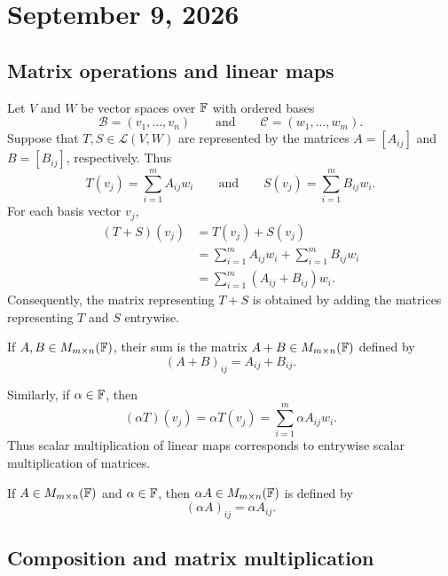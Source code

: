 \section{September 9, 2026}

\subsection{Matrix operations and linear maps}
\label{subsec:matrix-operations-linear-maps}

Let $V$ and $W$ be vector spaces over $\mathbb{F}$ with ordered bases
\[
  \mathcal B=(v_1,\ldots,v_n)
  \qquad\text{and}\qquad
  \mathcal C=(w_1,\ldots,w_m).
\]
Suppose that $T,S\in\mathcal L(V,W)$ are represented by the matrices
$A=[A_{ij}]$ and $B=[B_{ij}]$, respectively. Thus
\[
  T(v_j)=\sum_{i=1}^m A_{ij}w_i
  \qquad\text{and}\qquad
  S(v_j)=\sum_{i=1}^m B_{ij}w_i.
\]
For each basis vector $v_j$,
\begin{align*}
  (T+S)(v_j)
  &=T(v_j)+S(v_j) \\
  &=\sum_{i=1}^m A_{ij}w_i+\sum_{i=1}^m B_{ij}w_i \\
  &=\sum_{i=1}^m(A_{ij}+B_{ij})w_i.
\end{align*}
Consequently, the matrix representing $T+S$ is obtained by adding the
matrices representing $T$ and $S$ entrywise.

\begin{definition}
  If $A,B\in M_{m\times n}(\mathbb{F})$, their sum is the matrix
  $A+B\in M_{m\times n}(\mathbb{F})$ defined by
  \[
    (A+B)_{ij}=A_{ij}+B_{ij}.
  \]
\end{definition}

Similarly, if $\alpha\in\mathbb{F}$, then
\[
  (\alpha T)(v_j)
  =\alpha T(v_j)
  =\sum_{i=1}^m \alpha A_{ij}w_i.
\]
Thus scalar multiplication of linear maps corresponds to entrywise
scalar multiplication of matrices.

\begin{definition}
  If $A\in M_{m\times n}(\mathbb{F})$ and $\alpha\in\mathbb{F}$, then
  $\alpha A\in M_{m\times n}(\mathbb{F})$ is defined by
  \[
    (\alpha A)_{ij}=\alpha A_{ij}.
  \]
\end{definition}

\subsection{Composition and matrix multiplication}
\label{subsec:composition-matrix-multiplication}

